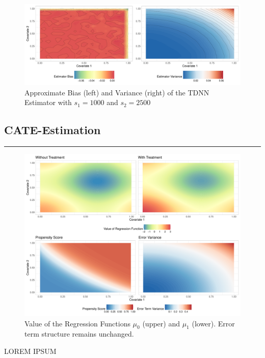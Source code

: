 \begin{figure}[H]
	\centering
	\includegraphics[width = \textwidth]{../Code/Simulations/Graphics/Reg_Exp1/TDNN/Plot_TDNN_n10000s_1000_2500.RDS.pdf}
	\caption{Approximate Bias (left) and Variance (right) of the TDNN Estimator with $s_1 = 1000$ and $s_2 = 2500$}
	\label{fig:est_bias_var}
\end{figure}


\subsection{CATE-Estimation}
\hrule

\begin{figure}[H]
	\centering
	\includegraphics[width = \textwidth]{../Graphics/CATE_Exmp1.pdf}
	\caption{Value of the Regression Functions $\mu_0$ (upper) and $\mu_1$ (lower).	Error term structure remains unchanged.}
	\label{fig:CATE_surfaces}
\end{figure}

{\color{red} LOREM IPSUM}